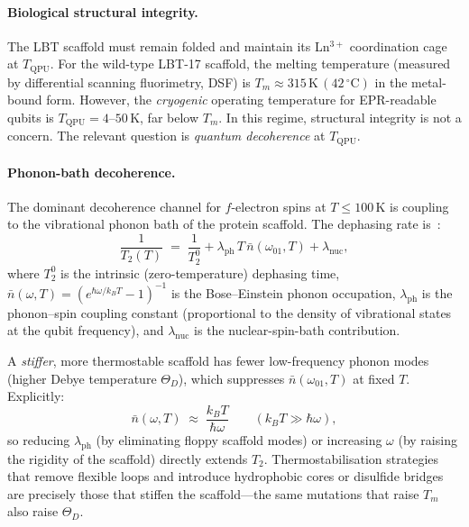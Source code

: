 \documentclass[11pt,oneside]{amsbook}
\numberwithin{equation}{section}
\theoremstyle{plain}
\theoremstyle{definition}
\theoremstyle{remark}
\begin{document}
\paragraph{Biological structural integrity.}
The LBT scaffold must remain folded and maintain its Ln$^{3+}$ coordination
cage at $T_{\mathrm{QPU}}$.  For the wild-type LBT-17 scaffold, the melting
temperature (measured by differential scanning fluorimetry, DSF) is
$T_m \approx 315\,\text{K}\,(42\,{}^\circ\text{C})$ in the metal-bound form.
However, the \emph{cryogenic} operating temperature for EPR-readable qubits
is $T_{\mathrm{QPU}} = 4$--$50\,\text{K}$, far below $T_m$.  In this regime,
structural integrity is not a concern.  The relevant question is
\emph{quantum decoherence} at $T_{\mathrm{QPU}}$.

\paragraph{Phonon-bath decoherence.}
The dominant decoherence channel for $f$-electron spins at $T \le 100\,\text{K}$
is coupling to the vibrational phonon bath of the protein scaffold.  The
dephasing rate is~\cite{MortonEtAl2011}:
\begin{equation}
  \frac{1}{T_2(T)} \;=\; \frac{1}{T_2^0}
    + \lambda_{\mathrm{ph}}\,T\,\bar{n}(\omega_{01},T)
    + \lambda_{\mathrm{nuc}},
\label{eq:T2_temp}
\end{equation}
where $T_2^0$ is the intrinsic (zero-temperature) dephasing time,
$\bar{n}(\omega,T) = (e^{\hbar\omega/k_BT}-1)^{-1}$ is the Bose--Einstein
phonon occupation,
$\lambda_{\mathrm{ph}}$ is the phonon--spin coupling constant (proportional
to the density of vibrational states at the qubit frequency), and
$\lambda_{\mathrm{nuc}}$ is the nuclear-spin-bath contribution.

A \emph{stiffer}, more thermostable scaffold has fewer low-frequency phonon
modes (higher Debye temperature $\Theta_D$), which suppresses
$\bar{n}(\omega_{01},T)$ at fixed $T$.  Explicitly:
\[
  \bar{n}(\omega,T) \;\approx\; \frac{k_B T}{\hbar\omega}
  \qquad (k_B T \gg \hbar\omega),
\]
so reducing $\lambda_{\mathrm{ph}}$ (by eliminating floppy scaffold modes)
or increasing $\omega$ (by raising the rigidity of the scaffold) directly
extends $T_2$.  Thermostabilisation strategies that remove flexible loops
and introduce hydrophobic cores or disulfide bridges are precisely those that
stiffen the scaffold---the same mutations that raise $T_m$ also raise
$\Theta_D$.
\end{document}
